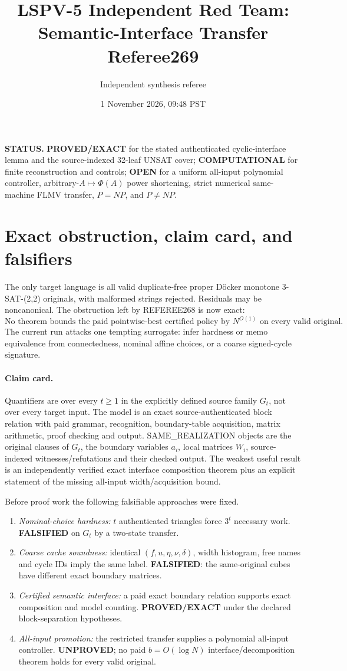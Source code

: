 \documentclass[11pt]{article}
\title{LSPV-5 Independent Red Team: Semantic-Interface Transfer Referee269}
\author{Independent synthesis referee}
\date{1 November 2026, 09:48 PST}
\begin{document}
\maketitle

\noindent\textbf{STATUS.} \textbf{PROVED/EXACT} for the stated authenticated cyclic-interface lemma and the source-indexed 32-leaf UNSAT cover; \textbf{COMPUTATIONAL} for finite reconstruction and controls; \textbf{OPEN} for a uniform all-input polynomial controller, arbitrary-$A\mapsto\Phi(A)$ power shortening, strict numerical same-machine FLMV transfer, $P=NP$, and $P\ne NP$.

\section{Exact obstruction, claim card, and falsifiers}
The only target language is all valid duplicate-free proper D\"ocker monotone 3-SAT-(2,2) originals, with malformed strings rejected.  Residuals may be noncanonical.  The obstruction left by REFEREE268 is now exact:
\[
 \boxed{\text{No theorem bounds the paid pointwise-best certified policy by }N^{O(1)}\text{ on every valid original.}}
\]
The current run attacks one tempting surrogate: infer hardness or memo equivalence from connectedness, nominal affine choices, or a coarse signed-cycle signature.

\paragraph{Claim card.} Quantifiers are over every $t\ge1$ in the explicitly defined source family $G_t$, not over every target input.  The model is an exact source-authenticated block relation with paid grammar, recognition, boundary-table acquisition, matrix arithmetic, proof checking and output.  SAME\_REALIZATION objects are the original clauses of $G_t$, the boundary variables $a_i$, local matrices $W_i$, source-indexed witnesses/refutations and their checked output.  The weakest useful result is an independently verified exact interface composition theorem plus an explicit statement of the missing all-input width/acquisition bound.

Before proof work the following falsifiable approaches were fixed.
\begin{enumerate}
\item \emph{Nominal-choice hardness:} $t$ authenticated triangles force $3^t$ necessary work.  \textbf{FALSIFIED} on $G_t$ by a two-state transfer.
\item \emph{Coarse cache soundness:} identical $(f,u,\eta,\nu,\delta)$, width histogram, free names and cycle IDs imply the same label.  \textbf{FALSIFIED}: the same-original cubes have different exact boundary matrices.
\item \emph{Certified semantic interface:} a paid exact boundary relation supports exact composition and model counting.  \textbf{PROVED/EXACT} under the declared block-separation hypotheses.
\item \emph{All-input promotion:} the restricted transfer supplies a polynomial all-input controller.  \textbf{UNPROVED}; no paid $b=O(\log N)$ interface/decomposition theorem holds for every valid original.
\end{enumerate}
\end{document}
